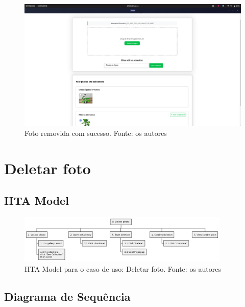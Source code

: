 \begin{figure}[H]
    \centering
    \includegraphics[width=1\textwidth]{../figures/screens/uc004/Screenshot from 2025-06-27 22-11-28.png}
    \caption{Foto removida com sucesso. Fonte: os autores}
    \label{fig:uc004-screen3}
\end{figure}

\section{Deletar foto}

\subsection{HTA Model}

\begin{figure}[H]
    \centering
    \includegraphics[width=0.9\textwidth]{../figures/hta/UC005.png}
    \caption{HTA Model para o caso de uso: Deletar foto. Fonte: os autores}
    \label{fig:hta-uc005}
\end{figure}

\subsection{Diagrama de Sequência}

